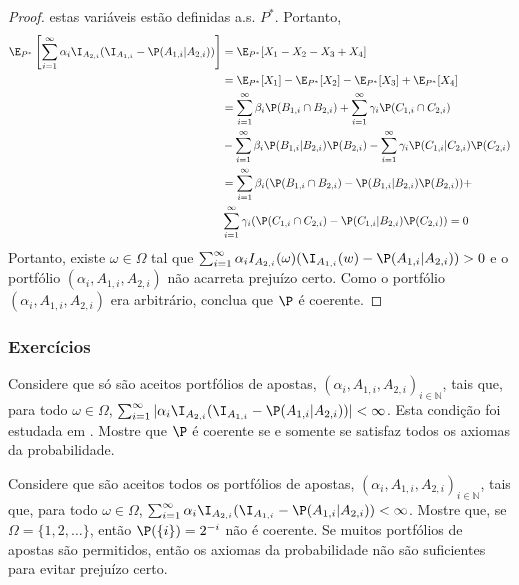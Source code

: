 \begin{proof}
 estas variáveis estão definidas a.s. $P^{*}$.
 Portanto,
 \begin{align*}
  \E_{P^{*}}\left[\sum_{i=1}^{\infty}{\alpha_{i}\I_{A_{2,i}}(\I_{A_{1,i}}
  -\P(A_{1,i}|A_{2,i}))}\right]
  &= \E_{P^{*}}[X_{1}-X_{2}-X_{3}+X_{4}] \\
  &= \E_{P^{*}}[X_{1}]-\E_{P^{*}}[X_{2}]
  -\E_{P^{*}}[X_{3}]+\E_{P^{*}}[X_{4}] \\
  &= \sum_{i=1}^{\infty}{\beta_{i}\P(B_{1,i} \cap B_{2,i})}
  + \sum_{i=1}^{\infty}{\gamma_{i}\P(C_{1,i} \cap C_{2,i})} \\ 
  &-\sum_{i=1}^{\infty}
  {\beta_{i}\P(B_{1,i}|B_{2,i})\P(B_{2,i})}
  -\sum_{i=1}^{\infty}
  {\gamma_{i}\P(C_{1,i}|C_{2,i})\P(C_{2,i})} \\
  &= \sum_{i=1}^{\infty}{\beta_{i}(\P(B_{1,i} \cap B_{2,i})-\P(B_{1,i}|B_{2,i})\P(B_{2,i}))} +\\
  &  \sum_{i=1}^{\infty}{\gamma_{i}(\P(C_{1,i} \cap C_{2,i})-\P(C_{1,i}|B_{2,i})\P(C_{2,i}))} = 0
 \end{align*}
 Portanto, existe $\omega \in \Omega$ tal que 
 $\sum_{i=1}^{\infty}{\alpha_{i}I_{A_{2,i}}(\omega)(\I_{A_{1,i}}(w)-\P(A_{1,i}|A_{2,i}))} > 0$ e
 o portfólio $(\alpha_{i},A_{1,i},A_{2,i})$ não 
 acarreta prejuízo certo.
 Como o portfólio $(\alpha_{i},A_{1,i},A_{2,i})$ era
 arbitrário, conclua que $\P$ é coerente.
\end{proof}

\subsubsection*{Exercícios}

\begin{exercise}[Desafio]
 \label{ex:coherence-adams}
 Considere que só são aceitos portfólios de apostas, 
 $(\alpha_i, A_{1,i}, A_{2,i})_{i \in \mathbb{N}}$,
 tais que, para todo $\omega \in \Omega$,
 $\sum_{i=1}^{\infty}{|\alpha_i \I_{A_{2,i}}(\I_{A_{1,i}}-\P(A_{1,i}|A_{2,i}))|} < \infty$.
 Esta condição foi estudada em \citet{Adams1962}.
 Mostre que $\P$ é coerente se e somente se 
 satisfaz todos os axiomas da probabilidade.
\end{exercise}

\begin{exercise}[Desafio]
 \label{ex:coherence-beam}
 Considere que são aceitos todos 
 os portfólios de apostas, 
 $(\alpha_i, A_{1,i}, A_{2,i})_{i \in \mathbb{N}}$,
 tais que, para todo $\omega \in \Omega$,
 $\sum_{i=1}^{\infty}{\alpha_i \I_{A_{2,i}}(\I_{A_{1,i}}-\P(A_{1,i}|A_{2,i}))} < \infty$.
 Mostre que, se $\Omega = \{1,2,\ldots\}$,
 então $\P(\{i\}) = 2^{-i}$ não é coerente.
 Se muitos portfólios de apostas são permitidos,
 então os axiomas da probabilidade não são suficientes
 para evitar prejuízo certo.
\end{exercise}


